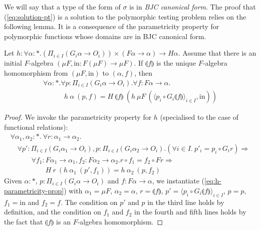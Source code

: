 \documentclass{llncs}
\newcommand{\fold}[1]{\llparenthesis #1 \rrparenthesis} %
\begin{document}
We will say that a type of the form of $\sigma$ is in {\em BJC
  canonical form}.  The proof that (\ref{eq:solution-pt}) is a
solution to the polymorphic testing problem relies on the following
lemma. It is a consequence of the parametricity property for
polymorphic functions whose domains are in BJC canonical form.
\begin{lemma}\label{lem:initial-algebra-ok}
  Let $h : \forall \alpha : *. \left(\Pi_{i \in I} (G_i \alpha \to
  O_i)\right) \times (F \alpha \to \alpha) \to H\alpha$. Assume that
  there is an initial $F$-algebra $(\mu F, \mathrm{in} : F(\mu F) \to
  \mu F)$. If $\fold{f}$ is the unique $F$-algebra homomorphism from
  $(\mu F, \mathrm{in})$ to $(\alpha, f)$, then
  \begin{displaymath}
    \begin{array}{l}
      \forall \alpha : *. \forall p : \Pi_{i \in I} (G_i \alpha \to O_i). \forall f : F\alpha \to \alpha.\\
      \quad\quad\quad h~\alpha~(p, f) = H~\fold{f}~(h~\mu F~(\langle p_i \circ G_i\fold{f} \rangle_{i \in I}, \mathrm{in}))
    \end{array}
  \end{displaymath}
\end{lemma}

\begin{proof}
  We invoke the parametricity property for $h$ (specialised to the case
  of functional relations):
  \begin{equation}
    \label{eq:h-parametricity-prop}
    \begin{array}{l}
      \forall \alpha_1, \alpha_2 : *.~\forall r : \alpha_1 \to \alpha_2. \\
      \quad \forall p' : \Pi_{i \in I}(G_i\alpha_1 \to O_i), p : \Pi_{i \in I}(G_i\alpha_2 \to O_i). (\forall i \in I.~p'_i = p_i \circ G_i r) \Rightarrow \\
      \quad\quad\quad \forall f_1 : F\alpha_1 \to \alpha_1, f_2 : F\alpha_2 \to \alpha_2. r \circ f_1 = f_2 \circ F r \Rightarrow \\
      \quad\quad\quad\quad\quad H~r~(h~\alpha_1~(p',f_1)) =
      h~\alpha_2~(p,f_2) 
    \end{array}
  \end{equation}
  Given $\alpha : *$, $p : \Pi_{i \in I} (G_i\alpha \to O_i)$ and $f :
  F\alpha \to \alpha$, we instantiate (\ref{eq:h-parametricity-prop})
  with $\alpha_1 = \mu F$, $\alpha_2 = \alpha$, $r = \fold{f}$, $p' =
  \langle p_i \circ G_i \fold{f} \rangle_{i \in I}$, $p = p$, $f_1 =
  \mathrm{in}$ and $f_2 = f$. The condition on $p'$ and $p$ in the
  third line holds by definition, and the condition on $f_1$ and $f_2$
  in the fourth and fifth lines holds by the fact that $\fold{f}$ is
  an $F$-algebra homomorphism.
\end{proof}
\end{document}
